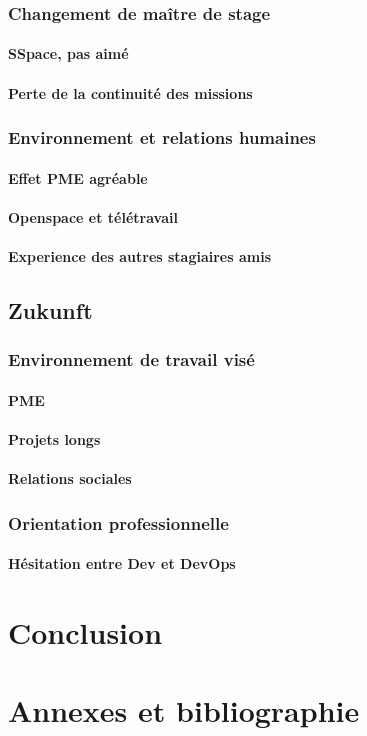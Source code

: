 \subsection{Changement de maître de stage}
\subsubsection{SSpace, pas aimé}

\subsubsection{Perte de la continuité des missions}


\subsection{Environnement et relations humaines}
\subsubsection{Effet PME agréable}

\subsubsection{Openspace et télétravail}

\subsubsection{Experience des autres stagiaires amis}



\section{Zukunft}
\subsection{Environnement de travail visé}
\subsubsection{PME}

\subsubsection{Projets longs}

\subsubsection{Relations sociales}


\subsection{Orientation professionnelle}
\subsubsection{Hésitation entre Dev et DevOps}




\chapter{Conclusion}




\chapter{Annexes et bibliographie}